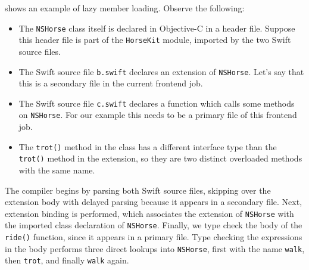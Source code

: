 \documentclass[../generics]{subfiles}
\begin{document}
\begin{example}
 shows an example of lazy member loading. Observe the following:
\begin{itemize}
\item The \texttt{NSHorse} class itself is declared in Objective-C in a header file. Suppose this header file is part of the \texttt{HorseKit} module, imported by the two Swift source files.
\item The Swift source file \texttt{b.swift} declares an extension of \texttt{NSHorse}. Let's say that this is a secondary file in the current frontend job.
\item The Swift source file \texttt{c.swift} declares a function which calls some methods on \texttt{NSHorse}. For our example this needs to be a primary file of this frontend job.
\item The \texttt{trot()} method in the class has a different interface type than the \texttt{trot()} method in the extension, so they are two distinct overloaded methods with the same name.
\end{itemize}
The compiler begins by parsing both Swift source files, skipping over the extension body with delayed parsing because it appears in a secondary file. Next, extension binding is performed, which associates the extension of \texttt{NSHorse} with the imported class declaration of \texttt{NSHorse}. Finally, we type check the body of the \texttt{ride()} function, since it appears in a primary file. Type checking the expressions in the body performs three direct lookups into \texttt{NSHorse}, first with the name \texttt{walk}, then \texttt{trot}, and finally \texttt{walk} again.

\newcommand{\LookupTableEntry}[1]{{\setlength{\fboxrule}{0pt}\fbox{\begin{tabular}{@{}l@{}}#1\end{tabular}}}}

\newcommand{\LookupTableElt}[1]{
\begin{tikzpicture}
\node [rounded corners, fill=light-gray] {#1};
\end{tikzpicture}
}

\smallskip


\end{example}
\end{document}
